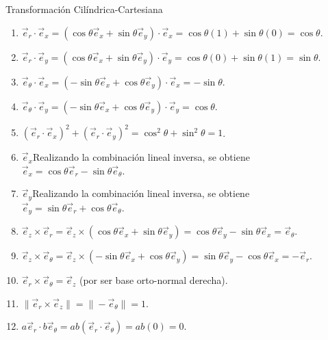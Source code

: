 \begin{solucion}{Transformación Cilíndrica-Cartesiana}
\begin{enumerate}
    \item $\vec{e}_r \cdot \vec{e}_x = (\cos\theta\vec{e}_x + \sin\theta\vec{e}_y) \cdot \vec{e}_x = \cos\theta(1) + \sin\theta(0) = \cos\theta$.
    \item $\vec{e}_r \cdot \vec{e}_y = (\cos\theta\vec{e}_x + \sin\theta\vec{e}_y) \cdot \vec{e}_y = \cos\theta(0) + \sin\theta(1) = \sin\theta$.
    \item $\vec{e}_\theta \cdot \vec{e}_x = (-\sin\theta\vec{e}_x + \cos\theta\vec{e}_y) \cdot \vec{e}_x = -\sin\theta$.
    \item $\vec{e}_\theta \cdot \vec{e}_y = (-\sin\theta\vec{e}_x + \cos\theta\vec{e}_y) \cdot \vec{e}_y = \cos\theta$.
    \item $(\vec{e}_r \cdot \vec{e}_x)^2 + (\vec{e}_r \cdot \vec{e}_y)^2 = \cos^2\theta + \sin^2\theta = 1$.
    \item $\vec{e}_x$Realizando la combinación lineal inversa, se obtiene $\vec{e}_x = \cos\theta\vec{e}_r - \sin\theta\vec{e}_\theta$.
    \item $\vec{e}_y$Realizando la combinación lineal inversa, se obtiene $\vec{e}_y = \sin\theta\vec{e}_r + \cos\theta\vec{e}_\theta$.
    \item $\vec{e}_z \times \vec{e}_r = \vec{e}_z \times (\cos\theta\vec{e}_x + \sin\theta\vec{e}_y) = \cos\theta\vec{e}_y - \sin\theta\vec{e}_x = \vec{e}_\theta$.
    \item $\vec{e}_z \times \vec{e}_\theta = \vec{e}_z \times (-\sin\theta\vec{e}_x + \cos\theta\vec{e}_y) = \sin\theta\vec{e}_y - \cos\theta\vec{e}_x = -\vec{e}_r$.
    \item $\vec{e}_r \times \vec{e}_\theta = \vec{e}_z$ (por ser base orto-normal derecha).
    \item $\| \vec{e}_r \times \vec{e}_z \| = \| -\vec{e}_\theta \| = 1$.
    \item $a\vec{e}_r \cdot b\vec{e}_\theta = ab(\vec{e}_r \cdot \vec{e}_\theta) = ab(0) = 0$.
\end{enumerate}
\end{solucion}

